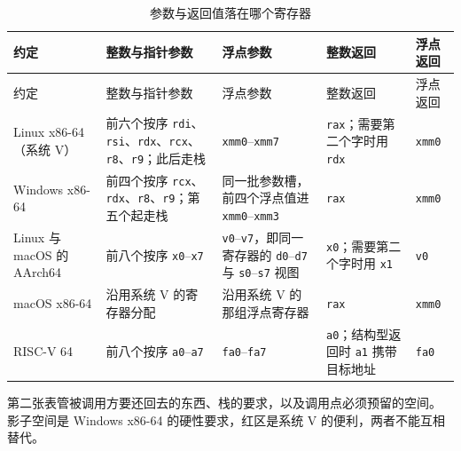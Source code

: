 \documentclass[12pt,a4paper,fontset=fandol]{ctexbook}
\newcommand{\Tp}[1]{\texttt{#1}}
\newcommand{\Lang}[1]{\textsf{#1}}
\newcommand{\Nix}{\textsf{Linux}}
\newcommand{\Win}{\textsf{Windows}}
\newcommand{\Mac}{\textsf{macOS}}
\newcommand{\xSixtyFour}{\textsf{x86-64}}
\newcommand{\ArmSixtyFour}{\textsf{AArch64}}
\begin{document}
\begin{longtable}{@{}>{\raggedright\arraybackslash}p{} >{\raggedright\arraybackslash}p{} >{\raggedright\arraybackslash}p{} >{\raggedright\arraybackslash}p{} >{\raggedright\arraybackslash}p{}@{}}
\caption{参数与返回值落在哪个寄存器}\label{tab:apB-reg-args}\\
\toprule
约定 & 整数与指针参数 & 浮点参数 & 整数返回 & 浮点返回 \\
\midrule
\endfirsthead
\toprule
约定 & 整数与指针参数 & 浮点参数 & 整数返回 & 浮点返回 \\
\midrule
\endhead
\bottomrule
\endfoot
\Nix{} \xSixtyFour（系统 V） &
前六个按序 \Tp{rdi}、\Tp{rsi}、\Tp{rdx}、\Tp{rcx}、\Tp{r8}、\Tp{r9}；此后走栈 &
\Tp{xmm0}--\Tp{xmm7} &
\Tp{rax}；需要第二个字时用 \Tp{rdx} &
\Tp{xmm0} \\
\Win{} \xSixtyFour &
前四个按序 \Tp{rcx}、\Tp{rdx}、\Tp{r8}、\Tp{r9}；第五个起走栈 &
同一批参数槽，前四个浮点值进 \Tp{xmm0}--\Tp{xmm3} &
\Tp{rax} &
\Tp{xmm0} \\
\Nix{} 与 \Mac{} 的 \ArmSixtyFour &
前八个按序 \Tp{x0}--\Tp{x7} &
\Tp{v0}--\Tp{v7}，即同一寄存器的 \Tp{d0}--\Tp{d7} 与 \Tp{s0}--\Tp{s7} 视图 &
\Tp{x0}；需要第二个字时用 \Tp{x1} &
\Tp{v0} \\
\Mac{} \xSixtyFour &
沿用系统 V 的寄存器分配 &
沿用系统 V 的那组浮点寄存器 &
\Tp{rax} &
\Tp{xmm0} \\
\Lang{RISC-V} 64 &
前八个按序 \Tp{a0}--\Tp{a7} &
\Tp{fa0}--\Tp{fa7} &
\Tp{a0}；结构型返回时 \Tp{a1} 携带目标地址 &
\Tp{fa0} \\
\end{longtable}

第二张表管被调用方要还回去的东西、栈的要求，以及调用点必须预留的空间。
影子空间是 \Win{} \xSixtyFour{} 的硬性要求，红区是系统 V 的便利，两者不能互相替代。
\end{document}
